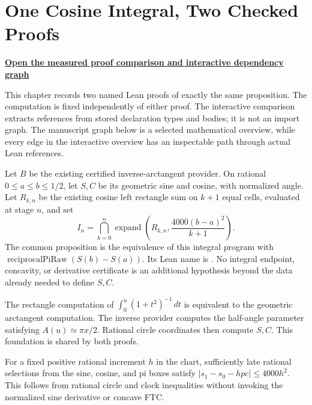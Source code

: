 \chapter{One Cosine Integral, Two Checked Proofs}
\label{ch:two-cosine-proofs}

\begin{center}
\href{proof-comparison/index.html}{\textbf{Open the measured proof comparison and interactive dependency graph}}
\end{center}

This chapter records two named Lean proofs of exactly the same proposition.
The computation is fixed independently of either proof.  The interactive
comparison extracts references from stored declaration types and bodies;
it is not an import graph.  The manuscript graph below is a selected
mathematical overview, while every edge in the interactive overview has
an inspectable path through actual Lean references.

\begin{definition}
\label{def:cosine-comparison-statement}
Let $B$ be the existing certified inverse-arctangent provider.  On rational
$0\le a\le b\le1/2$, let $S,C$ be its geometric sine and cosine, with
normalized angle.  Let $R_{k,n}$ be the existing cosine left rectangle sum
on $k+1$ equal cells, evaluated at stage $n$, and set
\[
 I_n=\bigcap_{k=0}^{n}\operatorname{expand}
       \left(R_{k,n},\frac{4000(b-a)^2}{k+1}\right).
\]
The common proposition is the equivalence of this integral program with
$\operatorname{reciprocalPiRaw}(S(b)-S(a))$.
Its Lean name is .
No integral endpoint, concavity, or derivative certificate is an additional
hypothesis beyond the data already needed to define $S,C$.
\end{definition}

\begin{lemma}
\label{lem:cosine-comparison-clock}
\leanok
The rectangle computation of $\int_0^u(1+t^2)^{-1}\,dt$ is equivalent to
the geometric arctangent computation.  The inverse provider computes the
half-angle parameter satisfying $A(u)\simeq\pi x/2$.  Rational circle
coordinates then compute $S,C$.  This foundation is shared by both proofs.
\end{lemma}

\begin{lemma}
\label{lem:cosine-comparison-residual}
\leanok
For a fixed positive rational increment $h$ in the chart, sufficiently
late rational selections from the sine, cosine, and pi boxes satisfy
$|s_1-s_0-hpc|\le4000h^2$.  This follows from rational circle and clock
inequalities without invoking the normalized sine derivative or concave FTC.
\end{lemma}

